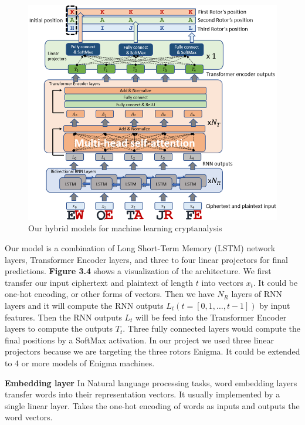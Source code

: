 \begin{figure}[hbt!]
    \centering
    \includegraphics[width=1\linewidth]{myReport//figures/ours.png}
    \caption{Our hybrid models for machine learning cryptanalysis}
    \label{fig:enter-label}
\end{figure}

Our model is a combination of Long Short-Term Memory (LSTM) network layers, Transformer Encoder layers, and three to four linear projectors for final predictions. \textbf{Figure 3.4} shows a visualization of the architecture. We first transfer our input ciphertext and plaintext of length \(t\) into vectors \(x_t\). It could be one-hot encoding, or other forms of vectors. Then we have \(N_R\) layers of RNN layers and it will compute the RNN outputs \(L_t ( t=[0,1,…,t-1])\) by input features. Then the RNN outputs \(L_t\) will be feed into the Transformer Encoder layers to compute the outputs \(T_t\). Three fully connected layers would compute the final positions by a SoftMax activation. In our project we used three linear projectors because we are targeting the three rotors Enigma. It could be extended to 4 or more models of Enigma machines.

\noindent\textbf{Embedding layer} \qquad		In Natural language processing tasks, word embedding layers transfer words into their representation vectors. It usually implemented by a single linear layer. Takes the one-hot encoding of words as inputs and outputs the word vectors. 

